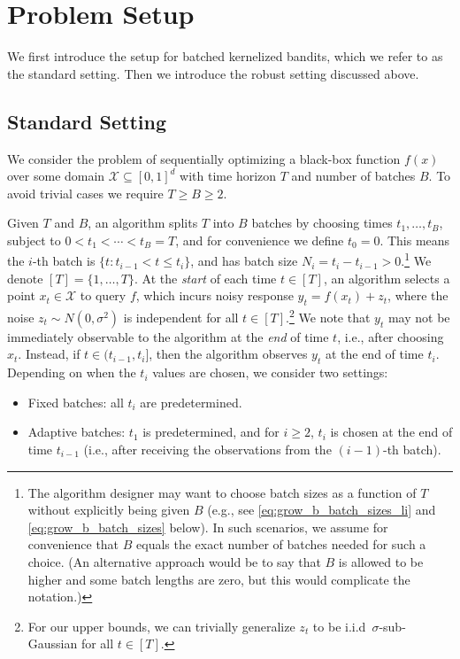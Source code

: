 \documentclass[10pt]{article}
\begin{document}
\section{Problem Setup}
\label{sec:setup}
We first introduce the setup for batched kernelized bandits, which we refer to as the standard setting. Then we introduce the robust setting discussed above.

\subsection{Standard Setting}
\label{sec:setup_standard}
We consider the problem of sequentially optimizing a black-box function $f(x)$ over some domain $\mathcal{X} \subseteq [0,1]^d$ with time horizon $T$ and number of batches $B$. To avoid trivial cases we require $T \geq B \geq 2$.

Given $T$ and $B$, an algorithm splits $T$ into $B$ batches by choosing times $t_1, \ldots, t_{B}$, subject to $0 < t_1 < \cdots < t_B = T$, and for convenience we define $t_0 = 0$. This means the $i$-th batch is $\{t:t_{i-1}< t\leq t_i \}$, and has batch size $N_i = t_i -t_{i-1}>0 $.\footnote{\label{fn:handle_extra_batches} 
The algorithm designer may want to choose batch sizes as a function of $T$ without explicitly being given $B$ (e.g., see \eqref{eq:grow_b_batch_sizes_li} and \eqref{eq:grow_b_batch_sizes} below).  In such scenarios, we assume for convenience that $B$ equals the exact number of batches needed for such a choice.  (An alternative approach would be to say that $B$ is allowed to be higher and some batch lengths are zero, but this would complicate the notation.)}
We denote $[T]=\{1,\ldots,T\}$. At the \emph{start} of each time $t \in [T]$, an algorithm selects a point $x_t\in\mathcal{X}$ to query $f$, which incurs noisy response $y_t=f(x_t)+z_t$, where the noise $z_t\sim N(0, \sigma^2)$ is independent for all $t\in[T]$.\footnote{For our upper bounds, we can trivially generalize $z_t$ to be i.i.d~$\sigma$-sub-Gaussian for all $t\in[T]$.} 
We note that $y_t$ may not be immediately observable to the algorithm at the \emph{end} of time $t$, i.e., after choosing $x_{t}$. Instead, if $t \in (t_{i-1}, t_i]$, then the algorithm observes $y_t$ at the end of time $t_i$.
Depending on when the $t_i$ values are chosen, we consider two settings:
\begin{itemize}
    \item Fixed batches: all $t_i$ are predetermined.
    \item Adaptive batches: $t_1$ is predetermined, and for $i\geq 2$, $t_i$ is chosen at the end of time $t_{i-1}$ (i.e., after receiving the observations from the $(i-1)$-th batch).
\end{itemize}
\end{document}
